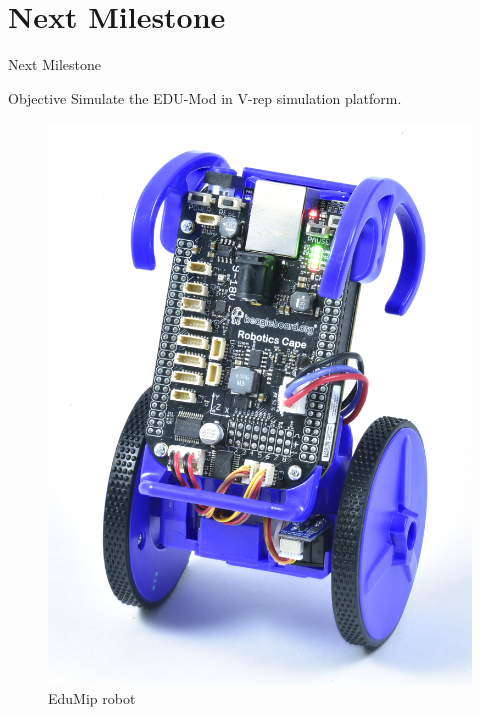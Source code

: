 \documentclass{beamer}
\begin{document}
\section{Next Milestone}
\begin{frame}{Next Milestone}
\begin{block}{Objective}
Simulate the EDU-Mod in V-rep simulation platform.
\end{block}
\begin{figure}
\includegraphics[scale=0.2]{figs/img/eduMip.jpeg}
\caption{EduMip robot}
\end{figure}
\end{frame}
\end{document}
